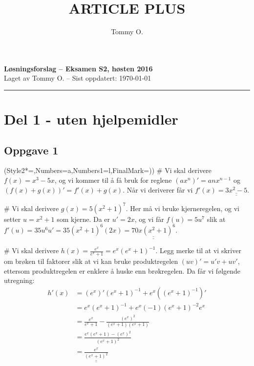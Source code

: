 \documentclass[12pt, a4paper]
{article}						%
\title{ARTICLE PLUS}
\author{Tommy O.}
\def\answer#1{\underline{\underline{#1}}}
\begin{document}
	\pagestyle{fancy}
	{\bfseries \Large Løsningsforslag -- Eksamen S2, høsten 2016} \\
	{ \footnotesize Laget av Tommy O. -- Sist oppdatert: \today}
	\hrule
	
	\section*{Del 1 - uten hjelpemidler}
	\subsection*{Oppgave 1}
	\begin{easylist}[enumerate]
		\ListProperties(Style2*=,Numbers=a,Numbers1=l,FinalMark={)})
		# Vi skal derivere $f(x) = x^3 - 5x$, og vi kommer til å få bruk for reglene $\left(ax^n\right)' = anx^{n-1}$ og $\left(f(x) + g(x)\right)' = f'(x) + g(x)$. 
		Når vi deriverer får vi $f'(x) = \answer{3x^2 - 5}$.
		
		# Vi skal derivere $g(x) = 5(x^2 + 1)^7$. 
		Her må vi bruke kjerneregelen, og vi setter $u = x^2 + 1$ som kjerne. Da er $u' = 2x$, og vi får $f(u) = 5u^7$ slik at $f'(u) = 35 u^6 u' = 35 \left(x^2 + 1\right)^6 \left(2x\right) = \answer{70x \left(x^2 + 1\right)^6}$.
		
		# Vi skal derivere $h(x) = \frac{e^x}{e^x + 1} = e^x \left(e^x + 1\right)^{-1}$.
		Legg merke til at vi skriver om brøken til faktorer slik at vi kan bruke produktregelen $(uv)' = u'v + uv'$, ettersom produktregelen er enklere å huske enn brøkregelen.
		Da får vi følgende utregning:
		\begin{align*}
		h'(x) &= \left( e^x \right)' \left(e^x + 1\right)^{-1} + e^x \left( \left(e^x + 1\right)^{-1} \right)' \\
		&= e^x \left(e^x + 1\right)^{-1} + e^x (-1) \left(e^x + 1\right)^{-2} e^x \\
		&= \frac{e^x}{e^x + 1} -\frac{\left(e^x\right)^2}{\left(e^x + 1\right) \left(e^x + 1\right)} \\
		&= \frac{e^x\left(e^x + 1\right) - \left(e^x\right)^2}{\left(e^x + 1\right)^2} \\
		&= \answer{\frac{e^x}{\left(e^x + 1\right)^2}}
		\end{align*}
	\end{easylist}
	
\end{document}
